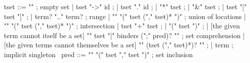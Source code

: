 \begin{syntax}
  tset ::= "\empty" ; empty set
       | tset "->" id ;
       | tset "." id ;
       | "*" tset ;
       | "&" tset ;
       | tset "[" tset "]" ;
       | term? ".." term? ; range
       | "\union" "(" tset ("," tset)* ")" ; union of locations
       | "\inter" "(" tset ("," tset)* ")" ; intersection
       | tset "+" tset ;
       | "(" tset ")" ;
       | {[the given term cannot itself be a set]
           "{" tset "|" binders (";" pred)? "}"} ; set comprehension
       | {[the given terms cannot themselves be a set] 
          "{" (tset ("," tset)*)? "}" };
       | term ; implicit singleton
       \
  pred ::= "\subset" "(" tset "," tset ")" ; set inclusion
\end{syntax}

